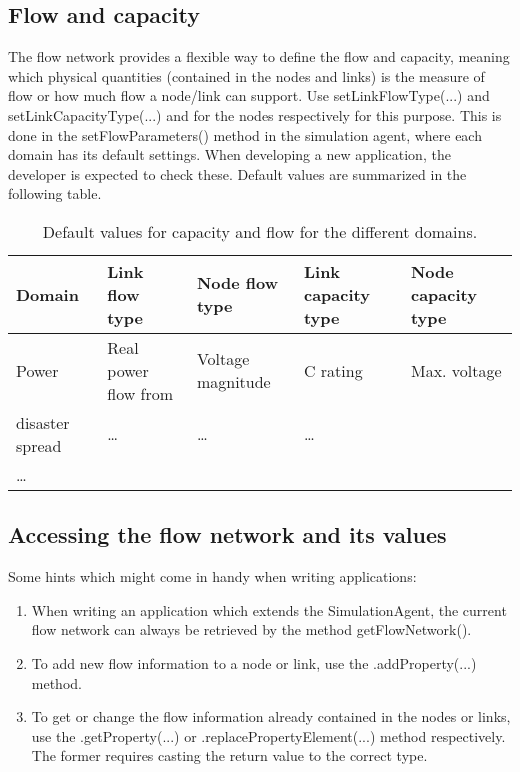 \documentclass[11pt,fleqn]{book} %
\newcommand{\mainagent}{simulation agent}
\newcommand{\Domain}[1][]{Domain#1} %
\newcommand{\domain}[1][]{domain#1}
\begin{document}
\subsection{Flow and capacity}
The flow network provides a flexible way to define the flow and capacity, meaning which physical quantities (contained in the nodes and links) is the measure of flow or how much flow a node/link can support. Use setLinkFlowType(...) and setLinkCapacityType(...) and for the nodes respectively for this purpose. This is done in the setFlowParameters() method in the \mainagent, where each \domain{} has its default settings. When developing a new application, the developer is expected to check these. Default values are summarized in the following table.
\begin{table}[h]
	\centering
	\begin{tabular}{|l| p{2.5cm}| p{2.5cm}|l|l|}
	\hline
	\rowcolor{Gray}
	\Domain{} & Link flow type & Node flow type & Link capacity type & Node capacity type\\
	\hline
	Power & Real power flow from & Voltage magnitude & C rating & Max. voltage\\
	\hline
	disaster spread &\dots &\dots &\dots &\\
	\hline
	\dots &&&&\\
	\hline
	\end{tabular}
	\caption{Default values for capacity and flow for the different \domain{s}.}
	\label{table:flow_capacity}
\end{table}

\subsection{Accessing the flow network and its values}
Some hints which might come in handy when writing applications:
\begin{enumerate}
	\item When writing an application which extends the SimulationAgent, the current flow network can always be retrieved by the method getFlowNetwork().
	\item To add new flow information to a node or link, use the .addProperty(...) method.
	\item To get or change the flow information already contained in the nodes or links, use the .getProperty(...) or .replacePropertyElement(...) method respectively. The former requires casting the return value to the correct type.
\end{enumerate}
\end{document}
